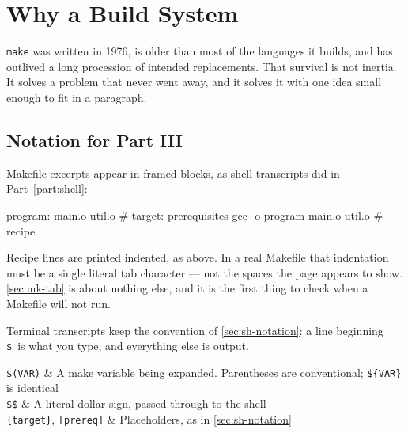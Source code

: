 \chapter{Why a Build System}\label{ch:mk-why}

\texttt{make} was written in 1976, is older than most of the languages it
builds, and has outlived a long procession of intended replacements. That
survival is not inertia. It solves a problem that never went away, and it
solves it with one idea small enough to fit in a paragraph.

\section{Notation for Part III}\label{sec:mk-notation}

Makefile excerpts appear in framed blocks, as shell transcripts did in
Part~\ref{part:shell}:

\begin{makecode}
program: main.o util.o        # target: prerequisites
    gcc -o program main.o util.o  # recipe
\end{makecode}

\begin{note}
	Recipe lines are printed indented, as above. In a real Makefile that
	indentation must be a single literal tab character --- not the spaces the page
	appears to show. \autoref{sec:mk-tab} is about nothing else, and it is the
	first thing to check when a Makefile will not run.
\end{note}

Terminal transcripts keep the convention of \autoref{sec:sh-notation}: a line
beginning \texttt{\$}~is what you type, and everything else is output.


\begin{keys}[0.24]
	\texttt{\$(VAR)}        & A make variable being expanded. Parentheses are conventional; \texttt{\$\{VAR\}} is identical \\
	\texttt{\$\$}           & A literal dollar sign, passed through to the shell             \\
	\texttt{\{target\}}, \texttt{[prereq]} & Placeholders, as in \autoref{sec:sh-notation}  \\
\end{keys}

